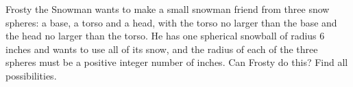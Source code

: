 Frosty the Snowman wants to make a small snowman friend from three snow spheres: a base, a torso and a head, with the torso no larger than the base and the head no larger than the torso. He has one spherical snowball of radius $6$ inches and wants to use all of its snow, and the radius of each of the three spheres must be a positive integer number of inches. Can Frosty do this? Find all possibilities.
